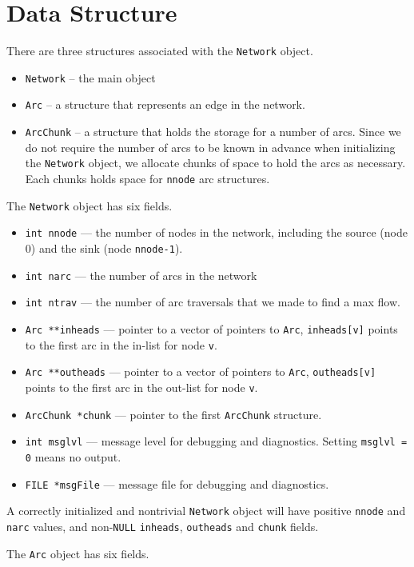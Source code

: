 \par
\section{Data Structure}
\par
There are three structures associated with the {\tt Network} object.
\begin{itemize}
\item
{\tt Network} -- the main object
\item
{\tt Arc} -- a structure that represents an edge in the network. 
\item
{\tt ArcChunk} -- a structure that holds the storage for a number
of arcs.
Since we do not require the number of arcs to be known in advance
when initializing the {\tt Network} object, we allocate chunks of
space to hold the arcs as necessary.
Each chunks holds space for {\tt nnode} arc structures.
\end{itemize}
\par
The {\tt Network} object has six fields.
\begin{itemize}
\item 
{\tt int nnode} ---
the number of nodes in the network, 
including the source (node {0}) and the sink (node {\tt nnode-1}).
\item 
{\tt int narc} ---
the number of arcs in the network
\item 
{\tt int ntrav} ---
the number of arc traversals that we made to find a max flow.
\item 
{\tt Arc **inheads} ---
pointer to a vector of pointers to {\tt Arc},
{\tt inheads[v]} points to the first arc in the in-list 
for node {\tt v}.
\item 
{\tt Arc **outheads} ---
pointer to a vector of pointers to {\tt Arc},
{\tt outheads[v]} points to the first arc in the out-list 
for node {\tt v}.
\item 
{\tt ArcChunk *chunk} ---
pointer to the first {\tt ArcChunk} structure.
\item 
{\tt int msglvl} ---
message level for debugging and diagnostics.
Setting {\tt msglvl = 0} means no output.
\item 
{\tt FILE *msgFile} ---
message file for debugging and diagnostics.
\end{itemize}
A correctly initialized and nontrivial {\tt Network} object 
will have positive {\tt nnode} and {\tt narc} values,
and non-{\tt NULL} {\tt inheads}, {\tt outheads}
and {\tt chunk} fields.
\par
The {\tt Arc} object has six fields.
